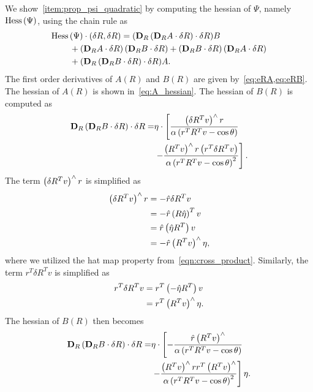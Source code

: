 We show~\cref{item:prop_psi_quadratic} by computing the hessian of \( \Psi \), namely \( \mathrm{Hess} \, (\Psi) \),  using the chain rule as 
\begin{align*}
    \Hess &(\Psi)\cdot (\delta R,\delta R)= (\mathbf{D}_R\parenth{\mathbf{D}_R A \cdot \delta R}\cdot \delta R) B\\
    & + \parenth{\dirDiff{A}{R} }\parenth{\dirDiff{B}{R}} 
    + \parenth{\dirDiff{B}{R} }\parenth{\dirDiff{A}{R}}\\ &+(\mathbf{D}_R\parenth{\mathbf{D}_R B \cdot \delta R}\cdot \delta R) A.
\end{align*}
The first order derivatives of \( A(R) \) and \( B(R) \) are given by~\cref{eq:eRA,eq:eRB}. 
The hessian of \( A(R) \) is shown in~\cref{eq:A_hessian}.
The hessian of \( B(R) \) is computed as
\begin{align*}
    \mathbf{D}_{R} \left( \mathbf{D}_{R} B \cdot \delta R \right) \cdot \delta R =& \eta \cdot \left[\frac{\left( \delta R^T v \right)^\wedge r}{\alpha\left( r^T R^T v - \cos \theta \right)} \right. \\
    & \left. - \frac{\left( R^T v \right)^\wedge r \left( r^T \delta R^T v \right)}{\alpha \left( r^TR^Tv - \cos \theta \right)^2}   \right] .
\end{align*}
The term \( \left( \delta R^T v \right)^\wedge r\) is simplified as
\begin{align*}
    \left( \delta R^T v \right)^\wedge r &= - \hat{r} \delta R ^T v  \\
    &= - \hat{r} \left( R \hat \eta \right)^T v  \\
    &= \hat{r} \left( \hat{\eta} R^T  \right) v  \\
    &= - \hat{r} \left( R^T v \right)^\wedge \eta ,
\end{align*}
where we utilized the hat map property from~\cref{eqn:cross_product}.
Similarly, the term \( r^T \delta R^T v \) is simplified as
\begin{align*}
    r^T \delta R^T v &= r^T \left( -\hat \eta R^T \right)v  \\
    &= r^T \left( R^T v \right)^\wedge \eta .
\end{align*}
The hessian of \( B(R) \) then becomes
\begin{align*}
    \mathbf{D}_{R} \left( \mathbf{D}_{R} B \cdot \delta R \right) \cdot \delta R =& \eta \cdot \left[ - \frac{ \hat r \left( R^T v \right)^\wedge}{\alpha \left( r^T R^T v - \cos \theta \right)} \right. \\ 
    & \left. - \frac{\left( R^T v \right)^\wedge r r^T \left( R^T v \right)^\wedge }{ \alpha\left( r^T R^T v - \cos \theta \right)^2}  \right] \eta .
\end{align*}
